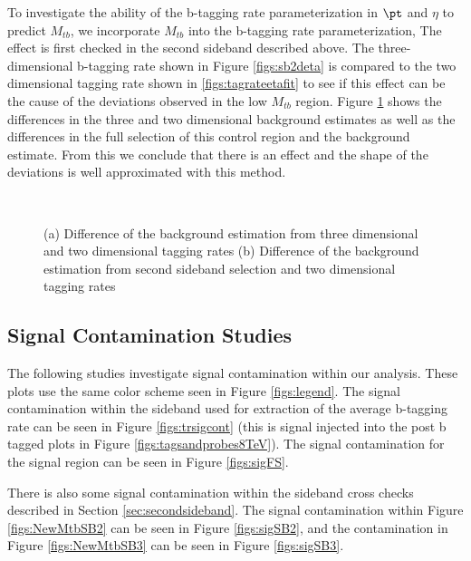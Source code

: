 To investigate the ability of the b-tagging rate parameterization in
$\pt$ and $\eta$ to predict $M_{tb}$, we incorporate $M_{tb}$ into the
b-tagging rate parameterization,  The effect is first checked in the
second sideband described above.  The three-dimensional b-tagging rate
shown in Figure \ref{figs:sb2deta} is compared to the two dimensional
tagging rate shown in \ref{figs:tagrateetafit} to see if this effect
can be the cause of the deviations observed in the low $M_{tb}$
region.  Figure \ref{figs:sb2comp} shows the differences in the three
and two dimensional background estimates as well as the differences in
the full selection of this control region and the background estimate.
From this we conclude that there is an effect and the shape of the
deviations is well approximated with this method.

\begin{figure}[Htcb]
\begin{center}
\\
\caption{
(a) Difference of the background estimation from three dimensional and two dimensional tagging rates
(b) Difference of the background estimation from second sideband selection and two dimensional tagging rates
}
\label{figs:sb2comp}
\end{center}
\end{figure}


\subsection{Signal Contamination Studies}
\label{sec:sigcont}
The following studies investigate signal contamination within our analysis.  These plots use the same color scheme seen in Figure \ref{figs:legend}.  
The signal contamination within the sideband used for extraction of the average b-tagging rate can be seen in Figure \ref{figs:trsigcont} (this is signal injected 
into the post b tagged plots in Figure \ref{figs:tagsandprobes8TeV}).  The signal contamination for the signal region can be seen in Figure \ref{figs:sigFS}.

There is also some signal contamination within the sideband cross checks described in Section \ref{sec:secondsideband}.  The signal contamination within Figure \ref{figs:NewMtbSB2} can be seen in Figure \ref{figs:sigSB2}, 
and the contamination in Figure \ref{figs:NewMtbSB3} can be seen in Figure \ref{figs:sigSB3}. 

